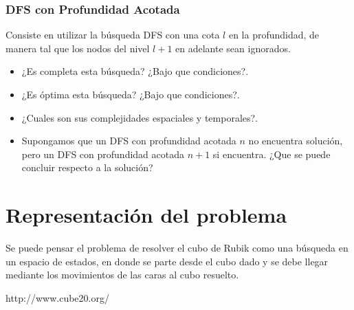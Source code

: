 \documentclass[11pt,a4paper]{article}
\begin{document}
\subsubsection{DFS con Profundidad Acotada}
Consiste en utilizar la búsqueda DFS con una cota $l$ en la profundidad, de manera tal que los nodos del nivel $l+1$ en adelante sean ignorados. 
\begin{itemize}
\item ¿Es completa esta búsqueda? ¿Bajo que condiciones?.
\item ¿Es óptima esta búsqueda? ¿Bajo que condiciones?.
\item ¿Cuales son sus complejidades espaciales y temporales?.
\item Supongamos que un DFS con profundidad acotada $n$ no encuentra solución, pero un DFS con profundidad acotada $n+1$ si encuentra. ¿Que se puede concluir respecto a la solución? 
\end{itemize}






\section{Representación del problema}

Se puede pensar el problema de resolver el cubo de Rubik como una búsqueda en un espacio de estados, en donde se parte desde el cubo dado y se debe llegar mediante los movimientos de las caras al cubo resuelto. 





\begin{thebibliography}{9}

  http://www.cube20.org/
  
\end{thebibliography}
\end{document}
